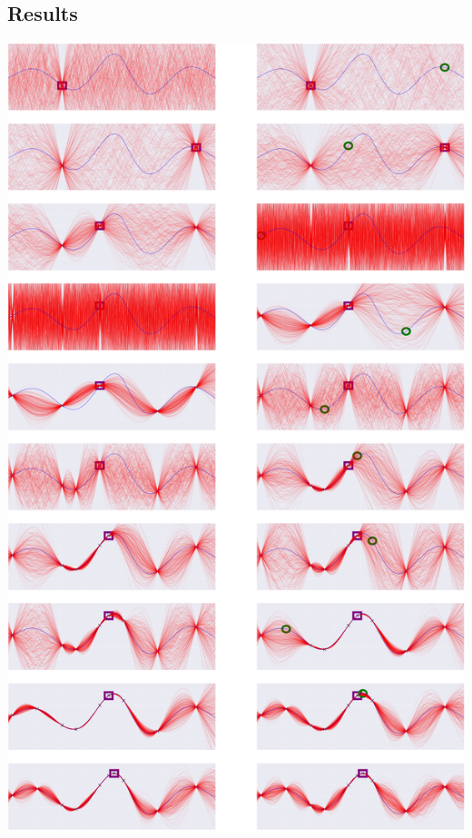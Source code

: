 \documentclass[a0,portrait]{a0poster}
\begin{document}
\begin{multicols}{3}

\subsection*{Results}
\begin{center}
  \includegraphics[width=20cm]{BayesOpt_gpmem_sequence.png}
\end{center}


\end{multicols}
\end{document}
